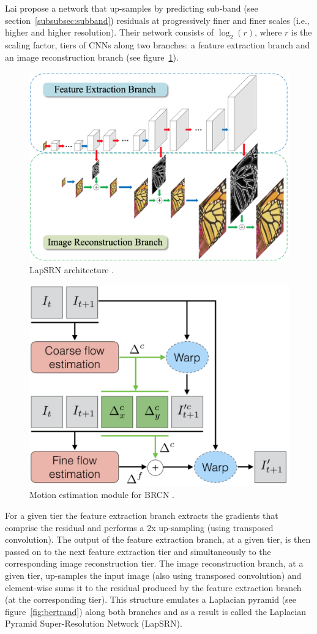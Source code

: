 Lai \etal \cite{Lai_2017} propose a network that up-samples by predicting sub-band (see section~\ref{subsubsec:subband}) residuals at progressively finer and finer scales (i.e., higher and higher resolution).
%
Their network consists of \(\log_2(r)\), where \(r\) is the scaling factor, tiers of CNNs along two branches: a feature extraction branch and an image reconstruction branch (see figure~\ref{fig:lapsrn}).
\begin{figure}[!htbp]
    \centering
    \begin{adjustbox}{width=\linewidth}
        \centering
        \includegraphics{figures/neural_networks/lapsrn.png}
    \end{adjustbox}
    \caption{LapSRN architecture \cite{Lai_2017}.}\label{fig:lapsrn}
\end{figure}
\begin{figure}[!htbp]
    \centering
    \includegraphics[width=.4\textwidth]{figures/neural_networks/motion_compensation.png}
    \caption{Motion estimation module for BRCN \cite{caballero2017real}.}\label{fig:motion_estimation}
\end{figure}
%
For a given tier the feature extraction branch extracts the gradients that comprise the residual and performs a 2x up-sampling (using transposed convolution). 
%
The output of the feature extraction branch, at a given tier, is then passed on to the next feature extraction tier and simultaneously to the corresponding image reconstruction tier.
%
The image reconstruction branch, at a given tier, up-samples the input image (also using transposed convolution) and element-wise sums it to the residual produced by the feature extraction branch (at the corresponding tier).
%
This structure emulates a Laplacian pyramid (see figure~\ref{fig:bertrand}) along both branches and as a result is called the Laplacian Pyramid Super-Resolution Network (LapSRN).

